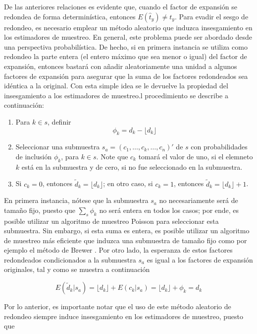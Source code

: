 \documentclass[
  12pt,
  spanish,
]{book}
\begin{document}
De las anteriores relaciones es evidente que, cuando el factor de expansión se redondea de forma determinística, entonces \(E(\hat t_y) \neq t_y\). Para evadir el sesgo de redondeo, es necesario emplear un método aleatorio que induzca insesgamiento en los estimadores de muestreo. En general, este problema puede ser abordado desde una perspectiva probabilística. De hecho, si en primera instancia se utiliza como redondeo la parte entera (el entero máximo que sea menor o igual) del factor de expansión, entonces bastará con añadir aleatoriamente una unidad a algunos factores de expansión para asegurar que la suma de los factores redondeados sea idéntica a la original. Con esta simple idea se le devuelve la propiedad del insesgamiento a los estimadores de muestreo.l procedimiento se describe a continuación:

\begin{enumerate}
\def\labelenumi{\arabic{enumi}.}
\item
  Para \(k \in s\), definir
  \[\phi_k = d_k - \lfloor d_k \rfloor\]
\item
  Seleccionar una submuestra \(s_a=(c_1,\ldots,c_k,\ldots,c_n)'\) de \(s\) con probabilidades de inclusión \(\phi_k\), para \(k\in s\). Note que \(c_k\) tomará el valor de uno, si el elemneto \(k\) está en la submuestra y de cero, si no fue seleccionado en la submuestra.
\item
  Si \(c_k = 0\), entonces \(\tilde d_k = \lfloor d_k \rfloor\); en otro caso, si \(c_k = 1\), entonces \(\tilde d_k = \lfloor d_k \rfloor + 1\).
\end{enumerate}

En primera instancia, nótese que la submuestra \(s_a\) no necesariamente será de tamaño fijo, puesto que \(\sum_s\phi_k\) no será entera en todos los casos; por ende, es posible utilizar un algoritmo de muestreo Poisson \citep[sección 4.1]{Gutierrez_2016} para seleccionar esta submuestra. Sin embargo, si esta suma es entera, es posible utilizar un algoritmo de muestreo más eficiente que induzca una submuestra de tamaño fijo como por ejemplo el método de Brewer \citep{Tille2006}. Por otro lado, la esperanza de estos factores redondeados condicionados a la submuestra \(s_a\) es igual a los factores de expansión originales, tal y como se muestra a continuación

\[
E(\tilde d_k | s_a) 
= \lfloor d_k \rfloor + E(c_k|s_a) 
= \lfloor d_k \rfloor + \phi_k
= d_k
\]

Por lo anterior, es importante notar que el uso de este método aleatorio de redondeo siempre induce insesgamiento en los estimadores de muestreo, puesto que
\end{document}
